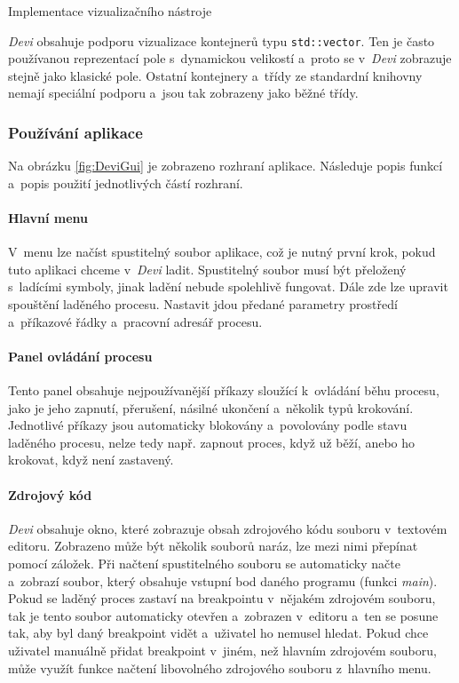 \documentclass[czech,bachelor,male,python,dept460,hidelinks]{diploma}						%
\newcommand{\parspace}[1][]{
	\ifthenelse{\isempty{#1}}{\vspace{0mm}}{\vspace{#1}}
	\par
}
\begin{document}
\begin{section}{Implementace vizualizačního nástroje}
	\parspace \textit{Devi} obsahuje podporu vizualizace kontejnerů typu \texttt{std::vector}. Ten je často používanou
	reprezentací pole s~dynamickou velikostí a~proto se v~\textit{Devi} zobrazuje stejně jako klasické pole. Ostatní kontejnery a~třídy ze standardní knihovny
	nemají speciální podporu a~jsou tak zobrazeny jako běžné třídy.
	
	\subsubsection{Používání aplikace}
	Na obrázku \ref{fig:DeviGui} je zobrazeno rozhraní aplikace. Následuje popis funkcí a~popis použití jednotlivých částí rozhraní.
	
	
	
	\paragraph*{Hlavní menu} V~menu lze načíst spustitelný soubor aplikace, což je nutný první krok, pokud tuto aplikaci chceme v~\textit{Devi} ladit.
		Spustitelný soubor musí být přeložený s~ladícími symboly, jinak ladění nebude spolehlivě fungovat. Dále zde lze upravit spouštění laděného procesu.
		Nastavit jdou předané parametry prostředí a~příkazové řádky a~pracovní adresář procesu.
	\paragraph*{Panel ovládání procesu} Tento panel obsahuje nejpoužívanější příkazy sloužící k~ovládání běhu procesu, jako je jeho zapnutí, přerušení, násilné
		ukončení a~několik typů krokování. Jednotlivé příkazy jsou automaticky blokovány a~povolovány podle stavu laděného procesu, nelze tedy např. zapnout
		proces, když už běží, anebo ho krokovat, když není zastavený.
	\paragraph*{Zdrojový kód} \textit{Devi} obsahuje okno, které zobrazuje obsah zdrojového kódu souboru v~textovém editoru. Zobrazeno může být několik souborů naráz,
		lze mezi nimi přepínat pomocí záložek. Při načtení spustitelného souboru se automaticky načte a~zobrazí soubor, který obsahuje vstupní bod daného programu
		(funkci \textit{main}). Pokud se laděný proces zastaví na breakpointu v~nějakém zdrojovém souboru, tak je tento soubor automaticky otevřen a~zobrazen
		v~editoru a~ten se posune tak, aby byl daný breakpoint vidět a~uživatel ho nemusel hledat. Pokud chce uživatel manuálně přidat breakpoint v~jiném, než
		hlavním zdrojovém souboru, může využít funkce načtení libovolného zdrojového souboru z~hlavního menu.
		

\end{section}
\end{document}
